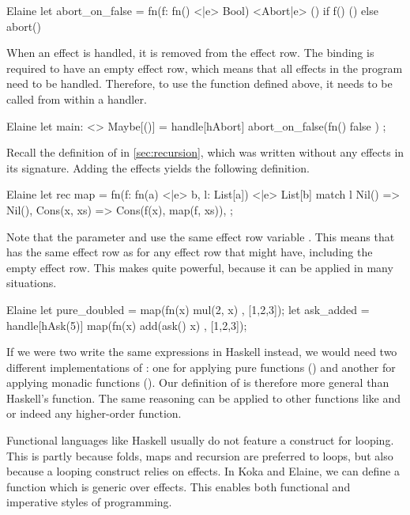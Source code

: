 \begin{lst}{Elaine}
let abort_on_false = fn(f: fn() <|e> Bool) <Abort|e> () {
    if f() { () } else { abort() }
}
\end{lst}
%
When an effect is handled, it is removed from the effect row. The  binding is required to have an empty effect row, which means that all effects in the program need to be handled. Therefore, to use the  function defined above, it needs to be called from within a handler.

\begin{lst}{Elaine}
let main: <> Maybe[()] = handle[hAbort] {
    abort_on_false(fn() { false })
};
\end{lst}

Recall the definition of  in \cref{sec:recursion}, which was written without any effects in its signature. Adding the effects yields the following definition.

\begin{lst}{Elaine}
let rec map = fn(f: fn(a) <|e> b, l: List[a]) <|e> List[b] {
    match l {
        Nil() => Nil(),
        Cons(x, xs) => Cons(f(x), map(f, xs)),
    }
};
\end{lst}
%
Note that the parameter  and  use the same effect row variable . This means that  has the same effect row as  for any effect row that  might have, including the empty effect row. This makes  quite powerful, because it can be applied in many situations.

\begin{lst}{Elaine}
let pure_doubled = map(fn(x) { mul(2, x) }, [1,2,3]);
let ask_added = handle[hAsk(5)] map(fn(x) { add(ask() x) }, [1,2,3]);
\end{lst}
%
If we were two write the same expressions in Haskell instead, we would need two different implementations of : one for applying pure functions () and another for applying monadic functions (). Our definition of  is therefore more general than Haskell's  function. The same reasoning can be applied to other functions like  and  or indeed any higher-order function.

Functional languages like Haskell usually do not feature a construct for looping. This is partly because folds, maps and recursion are preferred to loops, but also because a looping construct relies on effects. In Koka and Elaine, we can define a  function which is generic over effects. This enables both functional and imperative styles of programming.

